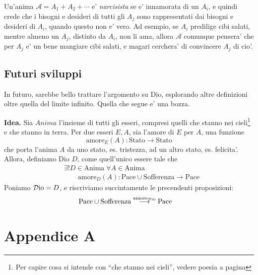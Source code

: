 Un'anima $\mathcal{A}=A_1+A_2+\cdots$ e' \emph{narcisista} se e' innamorata di un $A_i$, e quindi crede che i bisogni e desideri di tutti gli $A_j$ sono rappresentati dai bisogni e desideri di $A_i$, quando questo non e' vero. Ad esempio, se $A_i$ predilige cibi salati, mentre almeno un $A_j$, distinto da $A_i$, non li ama, allora $\mathcal{A}$ comunque pensera' che per $A_j$ e' un bene mangiare cibi salati, e magari cerchera' di convincere $A_j$ di cio'.


\subsection{Futuri sviluppi}
\label{FuturiSviluppiProcAssiomatico}
In futuro, sarebbe bello trattare l'argomento su Dio, esplorando altre definizioni oltre quella del limite infinito.
Quella che segue e' una bozza.

	\textbf{Idea. } Sia $\textit{Anima}$ l'insieme di tutti gli esseri, compresi quelli che stanno nei cieli\footnote{Per capire cosa si intende con ``che stanno nei cieli'', vedere poesia a pagina \pageref{DioScientificamentePoesia}} e che stanno in terra. Per due esseri $E,A$, sia l'amore di $E$ per $A$, una funzione 
    \[\textrm{amore}_E(A):\textrm{Stato}\longrightarrow\textrm{Stato}\]
    che porta l'anima $A$ da uno stato, es. tristezza, ad un altro stato, es. felicita'. Allora, definiamo Dio $D$, come quell'unico essere tale che
    \begin{align}
        &\exists ! D \in \textrm{Anima}\;\forall A \in \textrm{Anima}\;\;\nonumber\\
        &\qquad\textrm{amore}_D(A): \textrm{Pace}\cup\textrm{Sofferenza} \longrightarrow \textrm{Pace}
    \end{align}
    Poniamo $\mathcal{D}\textrm{io}=D$, e riscriviamo succintamente le precendenti proposizioni:
    \begin{align*}
        &\textrm{Pace}\cup\textrm{Sofferenza} \stackrel{\textrm{amore}_{\mathcal{D}\textrm{io}}}{\longrightarrow} \textrm{Pace}
    \end{align*}

\section{Appendice A}
\label{menteCrea}

